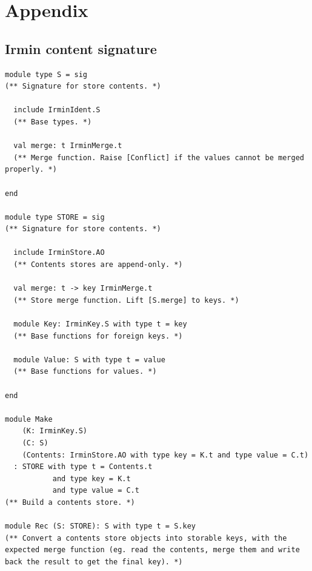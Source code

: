 \documentclass{article}
\newcommand{\irmin}{Irmin\xspace}
\begin{document}
\nocite{*}



\newpage

\section*{Appendix}
\addtocounter{section}{1}
\setcounter{subsection}{0}
\renewcommand{\thesubsection}{\Alph{subsection}}

\subsection{\irmin content signature\label{appendixcontent}}
\begin{lstlisting}
module type S = sig
(** Signature for store contents. *)

  include IrminIdent.S
  (** Base types. *)

  val merge: t IrminMerge.t
  (** Merge function. Raise [Conflict] if the values cannot be merged properly. *)

end

module type STORE = sig
(** Signature for store contents. *)

  include IrminStore.AO
  (** Contents stores are append-only. *)

  val merge: t -> key IrminMerge.t
  (** Store merge function. Lift [S.merge] to keys. *)

  module Key: IrminKey.S with type t = key
  (** Base functions for foreign keys. *)

  module Value: S with type t = value
  (** Base functions for values. *)

end

module Make
    (K: IrminKey.S)
    (C: S)
    (Contents: IrminStore.AO with type key = K.t and type value = C.t)
  : STORE with type t = Contents.t
           and type key = K.t
           and type value = C.t
(** Build a contents store. *)

module Rec (S: STORE): S with type t = S.key
(** Convert a contents store objects into storable keys, with the expected merge function (eg. read the contents, merge them and write back the result to get the final key). *)
\end{lstlisting}

\bigskip
\end{document}
